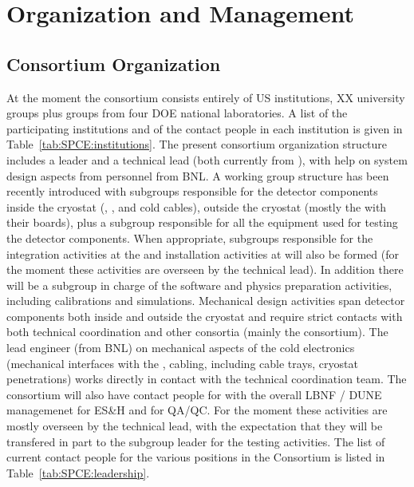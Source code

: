 \section{Organization and Management}
\label{sec:fdsp-tpcelec-management}

\subsection{Consortium Organization}
\label{sec:fdsp-tpcelec-management-consort}

At the moment the  consortium consists entirely of
US institutions, XX university groups plus groups from four
DOE national laboratories. A list of the participating institutions
and of the contact people in each institution is given in
Table~\ref{tab:SPCE:institutions}. The present consortium organization
structure includes a leader and a technical lead (both currently
from \fnal), with help on system design aspects from personnel
from BNL. A working group structure has been recently 
introduced with subgroups responsible for the detector 
components inside the cryostat (, , and
cold cables), outside the cryostat (mostly the  with 
their boards), plus a subgroup responsible for all the equipment
used for testing the detector components. When appropriate, subgroups
responsible for the integration activities at the  and
installation activities at \surf will also be formed (for the moment 
these activities are overseen by the technical lead). In addition
there will be a subgroup in charge of the software and physics
preparation activities, including calibrations and simulations.
Mechanical design activities span detector components both inside
and outside the cryostat and require strict contacts with both
technical coordination and other consortia (mainly the 
consortium). The lead engineer (from BNL) on mechanical aspects of the cold
electronics (mechanical interfaces with the , cabling, including 
cable trays, cryostat penetrations) works directly in contact with
the technical coordination team. The consortium will also have 
contact people for with the overall LBNF / DUNE managemenet for
ES\&H and for QA/QC. For the moment these activities are mostly
overseen by the technical lead, with the expectation that they
will be transfered in part to the subgroup leader for the testing
activities. The list of current contact people for the various 
positions in the Consortium is listed in Table~\ref{tab:SPCE:leadership}.

